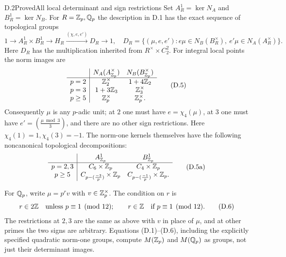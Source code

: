 \begin{statement}{D.2}{Proved}{All local determinant and sign restrictions}
Set \(A_R^1=\ker N_A\) and \(B_R^1=\ker N_B\).
For \(R=\mathbb Z_p,\mathbb Q_p\) the description in D.1 has the exact sequence
of topological groups
\[
 1\longrightarrow A_R^1\times B_R^1
 \longrightarrow H_R
 \xrightarrow{(\chi,e,e')}D_R\longrightarrow1,
 \quad
 D_R=\{(\mu,e,e'):e\mu\in N_B(B_R^\times),\
                         e'\mu\in N_A(A_R^\times)\}.
 \tag{D.4}
\]
Here \(D_R\) has the multiplication inherited from
\(R^\times\times C_2^2\).  For integral local points the norm images are
\[
\begin{array}{c|cc}
 &N_A(A_{\mathbb Z_p}^{\times})&N_B(B_{\mathbb Z_p}^{\times})\\ \hline
p=2&\mathbb Z_2^\times&1+4\mathbb Z_2\\
p=3&1+3\mathbb Z_3&\mathbb Z_3^\times\\
p\ge5&\mathbb Z_p^\times&\mathbb Z_p^\times .
\end{array}                                                   \tag{D.5}
\]
Consequently \(\mu\) is any \(p\)-adic unit; at \(2\) one must
have \(e=\chi_4(\mu)\), at \(3\) one must have
\(e'=\left(\frac{\mu\bmod3}{3}\right)\), and there are no other
sign restrictions.  Here \(\chi_4(1)=1,\chi_4(3)=-1\).
The norm-one kernels themselves have the following
noncanonical topological decompositions:
\[
 \begin{array}{c|cc}
 &A_{\mathbb Z_p}^{1}&B_{\mathbb Z_p}^{1}\\ \hline
 p=2,3&C_6\times\mathbb Z_p&C_4\times\mathbb Z_p\\
 p\ge5&C_{p-(\frac{-3}{p})}\times\mathbb Z_p&
             C_{p-(\frac{-1}{p})}\times\mathbb Z_p .
 \end{array}                                                   \tag{D.5a}
\]

For \(\mathbb Q_p\), write \(\mu=p^r v\) with \(v\in\mathbb Z_p^\times\).
The condition on \(r\) is
\[
 r\in 2\mathbb Z \quad\hbox{unless }p\equiv1\pmod {12};
 \qquad r\in\mathbb Z \quad\hbox{if }p\equiv1\pmod {12}.               \tag{D.6}
\]
The restrictions at \(2,3\) are the same as above with \(v\) in
place of \(\mu\), and at other primes the two signs are arbitrary.
Equations (D.1)--(D.6), including the explicitly specified
quadratic norm-one groups, compute \(M(\mathbb Z_p)\) and \(M(\mathbb Q_p)\)
as groups, not just their determinant images.
\end{statement}
